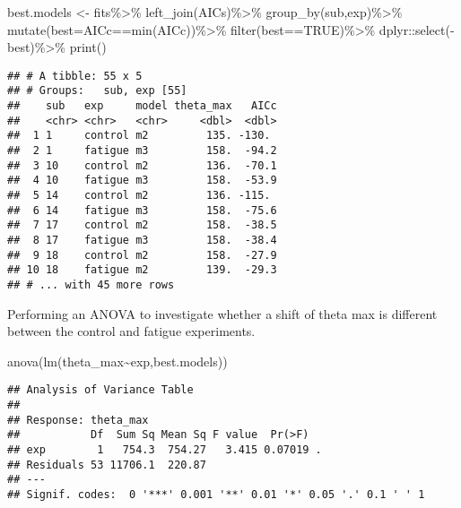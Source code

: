 \documentclass[
]{article}
\newenvironment{Shaded}{\begin{snugshade}}{\end{snugshade}}
\newcommand{\AttributeTok}[1]{\textcolor[rgb]{0.77,0.63,0.00}{#1}}
\newcommand{\ConstantTok}[1]{\textcolor[rgb]{0.00,0.00,0.00}{#1}}
\newcommand{\FunctionTok}[1]{\textcolor[rgb]{0.00,0.00,0.00}{#1}}
\newcommand{\NormalTok}[1]{#1}
\newcommand{\OtherTok}[1]{\textcolor[rgb]{0.56,0.35,0.01}{#1}}
\newcommand{\SpecialCharTok}[1]{\textcolor[rgb]{0.00,0.00,0.00}{#1}}
\begin{document}
\begin{Shaded}
\begin{Highlighting}[]
\NormalTok{best.models }\OtherTok{\textless{}{-}}\NormalTok{ fits}\SpecialCharTok{\%\textgreater{}\%}
  \FunctionTok{left\_join}\NormalTok{(AICs)}\SpecialCharTok{\%\textgreater{}\%}
  \FunctionTok{group\_by}\NormalTok{(sub,exp)}\SpecialCharTok{\%\textgreater{}\%}
  \FunctionTok{mutate}\NormalTok{(}\AttributeTok{best=}\NormalTok{AICc}\SpecialCharTok{==}\FunctionTok{min}\NormalTok{(AICc))}\SpecialCharTok{\%\textgreater{}\%}
  \FunctionTok{filter}\NormalTok{(best}\SpecialCharTok{==}\ConstantTok{TRUE}\NormalTok{)}\SpecialCharTok{\%\textgreater{}\%}
\NormalTok{  dplyr}\SpecialCharTok{::}\FunctionTok{select}\NormalTok{(}\SpecialCharTok{{-}}\NormalTok{best)}\SpecialCharTok{\%\textgreater{}\%}
  \FunctionTok{print}\NormalTok{()}
\end{Highlighting}
\end{Shaded}

\begin{verbatim}
## # A tibble: 55 x 5
## # Groups:   sub, exp [55]
##    sub   exp     model theta_max   AICc
##    <chr> <chr>   <chr>     <dbl>  <dbl>
##  1 1     control m2         135. -130. 
##  2 1     fatigue m3         158.  -94.2
##  3 10    control m2         136.  -70.1
##  4 10    fatigue m3         158.  -53.9
##  5 14    control m2         136. -115. 
##  6 14    fatigue m3         158.  -75.6
##  7 17    control m2         158.  -38.5
##  8 17    fatigue m3         158.  -38.4
##  9 18    control m2         158.  -27.9
## 10 18    fatigue m2         139.  -29.3
## # ... with 45 more rows
\end{verbatim}

Performing an ANOVA to investigate whether a shift of theta max is
different between the control and fatigue experiments.

\begin{Shaded}
\begin{Highlighting}[]
\FunctionTok{anova}\NormalTok{(}\FunctionTok{lm}\NormalTok{(theta\_max}\SpecialCharTok{\textasciitilde{}}\NormalTok{exp,best.models))}
\end{Highlighting}
\end{Shaded}

\begin{verbatim}
## Analysis of Variance Table
## 
## Response: theta_max
##           Df  Sum Sq Mean Sq F value  Pr(>F)  
## exp        1   754.3  754.27   3.415 0.07019 .
## Residuals 53 11706.1  220.87                  
## ---
## Signif. codes:  0 '***' 0.001 '**' 0.01 '*' 0.05 '.' 0.1 ' ' 1
\end{verbatim}
\end{document}
